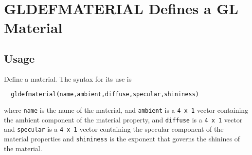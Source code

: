 \section{GLDEFMATERIAL Defines a GL Material}

\subsection{Usage}

Define a material.  The syntax for its use is
\begin{verbatim}
  gldefmaterial(name,ambient,diffuse,specular,shininess)
\end{verbatim}
where \verb|name| is the name of the material, and \verb|ambient|
is a \verb|4 x 1| vector containing the ambient component of 
the material property, and \verb|diffuse| is a \verb|4 x 1| vector
and \verb|specular| is a \verb|4 x 1| vector containing the specular
component of the material properties and \verb|shininess| is
the exponent that governs the shinines of the material.
